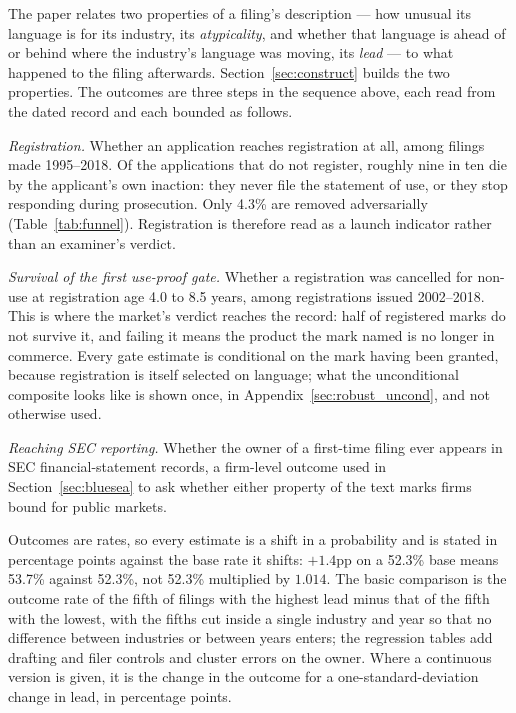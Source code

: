 The paper relates two properties of a filing's description --- how unusual
its language is for its industry, its \emph{atypicality}, and whether that
language is ahead of or behind where the industry's language was moving, its
\emph{lead} --- to what happened to the filing afterwards. Section~\ref{sec:construct}
builds the two properties. The outcomes are three steps in the sequence above,
each read from the dated record and each bounded as follows.

\emph{Registration.} Whether an application reaches registration at all,
among filings made 1995--2018. Of the applications that do not register,
roughly nine in ten die by the applicant's own inaction: they never file the
statement of use, or they stop responding during prosecution. Only 4.3\%
are removed adversarially (Table~\ref{tab:funnel}). Registration is
therefore read as a launch indicator rather than an examiner's verdict.

\emph{Survival of the first use-proof gate.} Whether a registration was
cancelled for non-use at registration age 4.0 to 8.5 years, among
registrations issued 2002--2018. This is where the market's verdict reaches
the record: half of registered marks do not survive it, and failing it means
the product the mark named is no longer in commerce. Every gate estimate is
conditional on the mark having been granted, because registration is itself
selected on language; what the unconditional composite looks like is shown
once, in Appendix~\ref{sec:robust_uncond}, and not otherwise used.

\emph{Reaching SEC reporting.} Whether the owner of a first-time filing ever
appears in SEC financial-statement records, a firm-level outcome used in
Section~\ref{sec:bluesea} to ask whether either property of the text marks
firms bound for public markets.

Outcomes are rates, so every estimate is a shift in a probability and is
stated in percentage points against the base rate it shifts: $+1.4$pp on a
52.3\% base means 53.7\% against 52.3\%, not 52.3\% multiplied by $1.014$.
The basic comparison is the outcome rate of the fifth of filings with the
highest lead minus that of the fifth with the lowest, with the fifths cut
inside a single industry and year so that no difference between industries or
between years enters; the regression tables add drafting and filer controls
and cluster errors on the owner. Where a continuous version is given, it is
the change in the outcome for a one-standard-deviation change in lead, in
percentage points.

